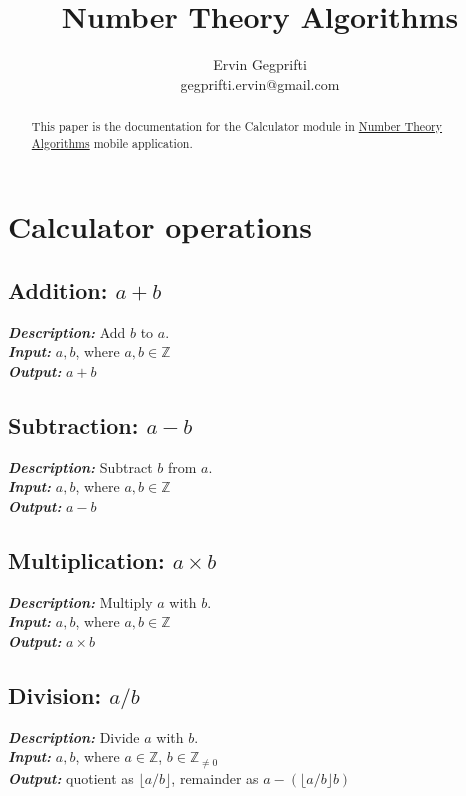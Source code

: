 \documentclass[12pt,oneside,a4paper]{article}
\title{Number Theory Algorithms}
\author{Ervin Gegprifti \\ [6pt]
	gegprifti.ervin@gmail.com}
\date{}
\begin{document}
\pagecolor{bgcolor}

\maketitle

\begin{abstract}
	This paper is the documentation for the Calculator module in \href{https://play.google.com/store/apps/details?id=com.gegprifti.android.numbertheoryalgorithms}{Number Theory Algorithms} mobile application.
\end{abstract}

\section*{Calculator operations}	
\subsection*{Addition: $a+b$}
\textbf{\emph{Description:}} Add $b$ to $a$. \\
\textbf{\emph{Input:}} $a,b$, where $a,b \in \mathbb{Z}$ \\ 
\textbf{\emph{Output:}} $a+b$

\subsection*{Subtraction: $a-b$}
\textbf{\emph{Description:}} Subtract $b$ from $a$. \\
\textbf{\emph{Input:}} $a,b$, where $a,b \in \mathbb{Z}$ \\
\textbf{\emph{Output:}} $a-b$

\subsection*{Multiplication: $a \times b$}
\textbf{\emph{Description:}} Multiply $a$ with $b$. \\
\textbf{\emph{Input:}} $a,b$, where $a,b \in \mathbb{Z}$ \\
\textbf{\emph{Output:}} $a \times b$

\subsection*{Division: $a/b$}
\textbf{\emph{Description:}} Divide $a$ with $b$. \\
\textbf{\emph{Input:}} $a,b$, where $a \in \mathbb{Z}$, $b \in \mathbb{Z}_{\ne 0}$ \\
\textbf{\emph{Output:}} quotient as $\lfloor a/b \rfloor$, remainder as $a-(\lfloor a/b \rfloor b)$
\end{document}
